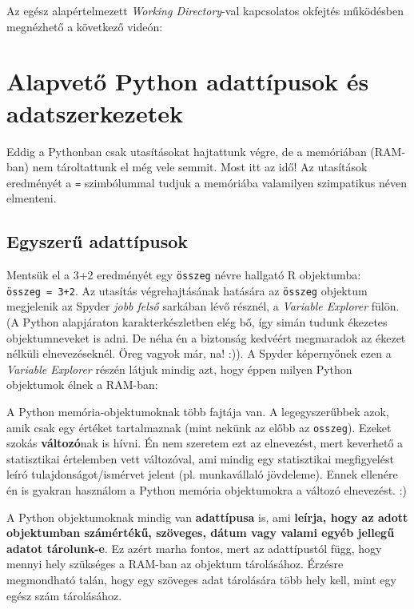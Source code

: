 \documentclass[
]{book}
\begin{document}
Az egész alapértelmezett \emph{Working Directory}-val kapcsolatos okfejtés működésben megnézhető a következő videón:

\section{Alapvető Python adattípusok és adatszerkezetek}\label{alapvetux151-python-adattuxedpusok-uxe9s-adatszerkezetek}

Eddig a Pythonban csak utasításokat hajtattunk végre, de a memóriában (RAM-ban) nem tároltattunk el még vele semmit.
Most itt az idő! Az utasítások eredményét a \texttt{=} szimbólummal tudjuk a memóriába valamilyen szimpatikus néven elmenteni.

\subsection{Egyszerű adattípusok}\label{egyszerux171-adattuxedpusok}

Mentsük el a 3+2 eredményét egy \texttt{összeg} névre hallgató R objektumba: \texttt{összeg\ =\ 3+2}. Az utasítás végrehajtásának hatására az \texttt{összeg} objektum megjelenik az Spyder \emph{jobb felső} sarkában lévő résznél, a \emph{Variable Explorer} fülön. (A Python alapjáraton karakterkészletben elég bő, így simán tudunk ékezetes objektumneveket is adni. De néha én a biztonság kedvéért megmaradok az ékezet nélküli elnevezéseknél. Öreg vagyok már, na! :)). A Spyder képernyőnek ezen a \emph{Variable Explorer} részén látjuk mindig azt, hogy éppen milyen Python objektumok élnek a RAM-ban:

A Python memória-objektumoknak több fajtája van. A legegyszerűbbek azok, amik csak egy értéket tartalmaznak (mint nekünk az előbb az \texttt{osszeg}). Ezeket szokás \textbf{változó}nak is hívni. Én nem szeretem ezt az elnevezést, mert keverhető a statisztikai értelemben vett változóval, ami mindig egy statisztikai megfigyelést leíró tulajdonságot/ismérvet jelent (pl. munkavállaló jövdeleme). Ennek ellenére én is gyakran használom a Python memória objektumokra a változó elnevezést. :)

A Python objektumoknak mindig van \textbf{adattípusa} is, ami \textbf{leírja, hogy az adott objektumban számértékű, szöveges, dátum vagy valami egyéb jellegű adatot tárolunk-e}. Ez azért marha fontos, mert az adattípustól függ, hogy mennyi hely szükséges a RAM-ban az objektum tárolásához. Érzésre megmondható talán, hogy egy szöveges adat tárolására több hely kell, mint egy egész szám tárolásához.
\end{document}
